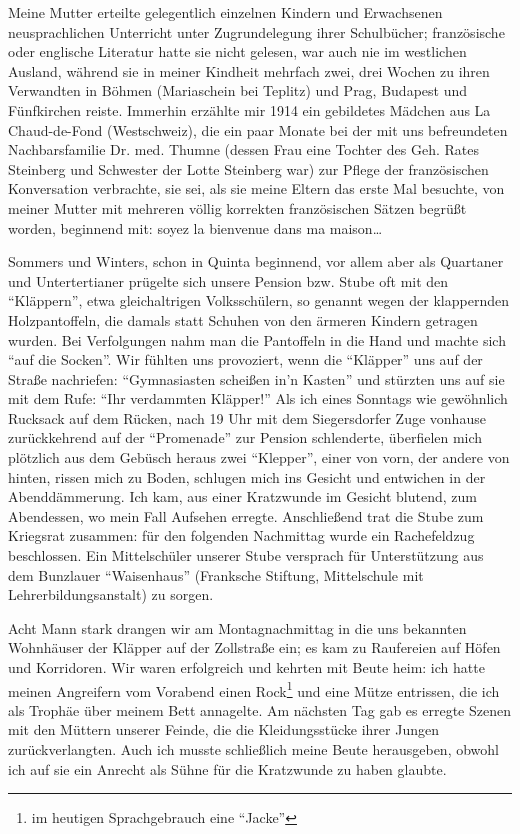 Meine Mutter erteilte gelegentlich einzelnen Kindern und Erwachsenen neusprachlichen Unterricht unter Zugrundelegung ihrer Schulbücher; französische oder englische Literatur hatte sie nicht gelesen, war auch nie im westlichen Ausland, während sie in meiner Kindheit mehrfach zwei, drei Wochen zu ihren Verwandten in Böhmen (Mariaschein bei Teplitz) und Prag, Budapest und Fünfkirchen reiste. Immerhin erzählte mir 1914 ein gebildetes Mädchen aus La Chaud-de-Fond (Westschweiz), die ein paar Monate bei der mit uns befreundeten Nachbarsfamilie Dr. med. Thumne (dessen Frau eine Tochter des Geh. Rates Steinberg und Schwester der Lotte Steinberg war) zur Pflege der französischen Konversation verbrachte, sie sei, als sie meine Eltern das erste Mal besuchte, von meiner Mutter mit mehreren völlig korrekten französischen Sätzen begrüßt worden, beginnend mit: soyez la bienvenue dans ma maison\dots

Sommers und Winters, schon in Quinta beginnend, vor allem aber als Quartaner und Untertertianer prügelte sich unsere Pension bzw. Stube oft mit den \enquote{Kläppern}, etwa gleichaltrigen Volksschülern, so genannt wegen der klappernden Holzpantoffeln, die damals statt Schuhen von den ärmeren Kindern getragen wurden. Bei Verfolgungen nahm man die Pantoffeln in die Hand und machte sich \enquote{auf die Socken}. Wir fühlten uns provoziert, wenn die \enquote{Kläpper} uns auf der Straße nachriefen: \enquote{Gymnasiasten scheißen in'n Kasten} und stürzten uns auf sie mit dem Rufe: \enquote{Ihr verdammten Kläpper!} Als ich eines Sonntags wie gewöhnlich Rucksack auf dem Rücken, nach 19 Uhr mit dem Siegersdorfer Zuge vonhause zurückkehrend auf der \enquote{Promenade} zur Pension schlenderte, überfielen mich plötzlich aus dem Gebüsch heraus zwei \enquote{Klepper}, einer von vorn, der andere von hinten, rissen mich zu Boden, schlugen mich ins Gesicht und entwichen in der Abenddämmerung. Ich kam, aus einer Kratzwunde im Gesicht blutend, zum Abendessen, wo mein Fall Aufsehen erregte. Anschließend trat die Stube zum Kriegsrat zusammen: für den folgenden Nachmittag wurde ein Rachefeldzug beschlossen. Ein Mittelschüler unserer Stube versprach für Unterstützung aus dem Bunzlauer \enquote{Waisenhaus} (Franksche Stiftung, Mittelschule mit Lehrerbildungsanstalt) zu sorgen.

Acht Mann stark drangen wir am Montagnachmittag in die uns bekannten Wohnhäuser der Kläpper auf der Zollstraße ein; es kam zu Raufereien auf Höfen und Korridoren. Wir waren erfolgreich und kehrten mit Beute heim: ich hatte meinen Angreifern vom Vorabend einen Rock\footnote{im heutigen Sprachgebrauch eine \enquote{Jacke}} und eine Mütze entrissen, die ich als Trophäe über meinem Bett annagelte. Am nächsten Tag gab es erregte Szenen mit den Müttern unserer Feinde, die die Kleidungsstücke ihrer Jungen zurückverlangten. Auch ich musste schließlich meine Beute herausgeben, obwohl ich auf sie ein Anrecht als Sühne für die Kratzwunde zu haben glaubte.


